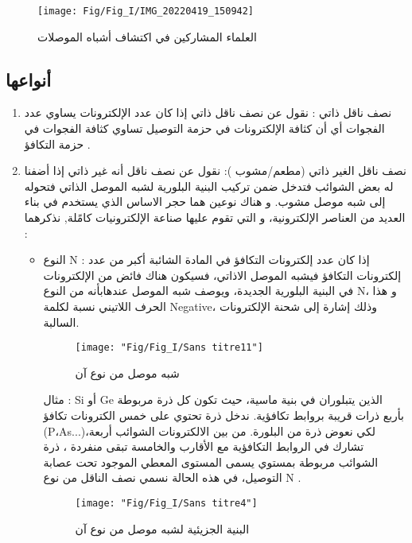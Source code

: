 \begin{figure}[bh]
	\centering
	\texttt{[image: Fig/Fig\_I/IMG\_20220419\_150942]}
	\caption{العلماء المشاركين في اكتشاف أشباه الموصلات}
	\label{fig:img20220419150942}
\end{figure}
\FloatBarrier

\subsection{ أنواعها}

\begin{enumerate}
	\item 
	نصف ناقل ذاتي : نقول عن نصف ناقل ذاتي إذا كان عدد الإلكترونات يساوي عدد الفجوات أي أن كثافة الإلكترونات في 
	حزمة التوصيل تساوي كثافة الفجوات في حزمة التكافؤ .
	\item 
	نصف ناقل الغير ذاتي (مطعم/مشوب ): نقول عن نصف ناقل أنه غير ذاتي إذا أضفنا له بعض الشوائب فتدخل ضمن تركيب البنية البلورية لشبه الموصل الذاتي فتحوله إلى شبه موصل مشوب. 
	و هناك نوعين هما حجر الاساس الذي يستخدم في بناء العديد من العناصر الإلكترونية، و التي تقوم عليها صناعة الإلكترونيات كامًلة, نذكرهما :
	\begin{itemize}
		\item 
		النوع N : إذا كان عدد إلكترونات التكافؤ في المادة الشائبة أكبر من عدد إلكترونات التكافؤ فيشبه الموصل الاذاتي، فسيكون هناك فائض من الإلكترونات في البنية البلورية الجديدة، ويوصف شبه الموصل عندهابأنه من النوع N، و هذا الحرف اللاتيني نسبة لكلمة Negative، وذلك إشارة إلى شحنة الإلكترونات السالبة.
		
		\begin{figure}[h]
			\centering
			\texttt{[image: "Fig/Fig\_I/Sans titre11"]}
			\caption{شبه موصل من نوع آن}
			\label{fig:sans-titre11}
		\end{figure}
	\FloatBarrier
		
		مثال : Si أو Ge الذين يتبلوران في بنية ماسية، حيث تكون كل ذرة مربوطة بأربع ذرات قريبة بروابط تكافؤية. ندخل ذرة تحتوي على خمس الكترونات تكافؤ (P،As...)،لكي نعوض ذرة من البلورة. من بين الالكترونات الشوائب أربعة تشارك في الروابط التكافؤية مع الأقارب والخامسة تبقى منفردة ، ذرة الشوائب مربوطة بمستوي يسمى المستوى المعطي الموجود تحت عصابة التوصيل، في هذه الحالة نسمي نصف الناقل من نوع N .
		
		\begin{figure}[h]
			\centering
			\texttt{[image: "Fig/Fig\_I/Sans titre4"]}
			\caption{البنية الجزيئية لشبه موصل من نوع آن}
			\label{fig:sans-titre4}
		\end{figure}
	\FloatBarrier
		

\end{itemize}
\end{enumerate}

